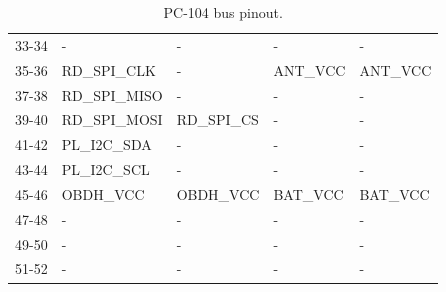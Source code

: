 \begin{table}[!h]
\begin{tabular}{cllll}
        33-34              & -                & -                & -               & -                \\
        35-36              & RD\_SPI\_CLK     & -                & ANT\_VCC        & ANT\_VCC         \\
        37-38              & RD\_SPI\_MISO    & -                & -               & -                \\
        39-40              & RD\_SPI\_MOSI    & RD\_SPI\_CS      & -               & -                \\
        41-42              & PL\_I2C\_SDA     & -                & -               & -                \\
        43-44              & PL\_I2C\_SCL     & -                & -               & -                \\
        45-46              & OBDH\_VCC        & OBDH\_VCC        & BAT\_VCC        & BAT\_VCC         \\
        47-48              & -                & -                & -               & -                \\
        49-50              & -                & -                & -               & -                \\
        51-52              & -                & -                & -               & -                \\
        \bottomrule[1.5pt]
    \end{tabular}
    \caption{PC-104 bus pinout.}
    \label{tab:pc104-pinout}
\end{table}

